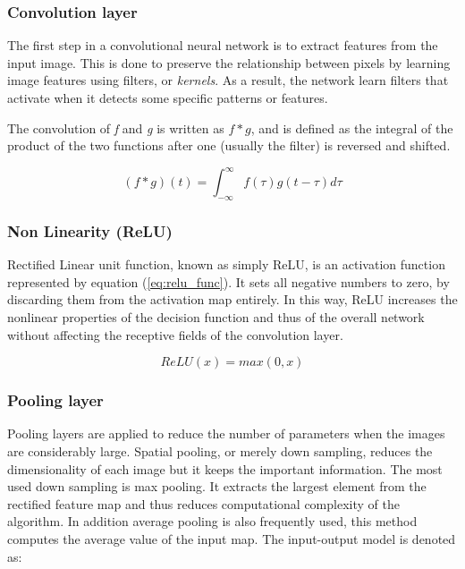 \documentclass[thesis.tex]{subfiles}
\begin{document}
\subsubsection{Convolution layer}
The first step in a convolutional neural network is to extract features from the input image. This is done to preserve the relationship between pixels by learning image features using filters, or \textit{kernels}. As a result, the network learn filters that activate when it detects some specific patterns or features.

The convolution of \textit{f} and \textit{g} is written as $f*g$, and is defined as the integral of the product of the two functions after one (usually the filter) is reversed and shifted.

\begin{equation} %
  (f*g)(t) = \int_{-\infty}^{\infty} f(\tau) g(t-\tau) d\tau
  \label{eq:convolution_func}
\end{equation}


\subsubsection{Non Linearity (ReLU)}
Rectified Linear unit function, known as simply ReLU, is an activation function represented by equation (\ref{eq:relu_func}). It sets all negative numbers to zero, by discarding them from the activation map entirely. In this way, ReLU increases the nonlinear properties of the decision function and thus of the overall network without affecting the receptive fields of the convolution layer.

\begin{equation} %
    ReLU(x) = max(0, x)
    \label{eq:relu_func}
\end{equation}


\subsubsection{Pooling layer}
Pooling layers are applied to reduce the number of parameters when the images are considerably large. Spatial pooling, or merely down sampling, reduces the dimensionality of each image but it keeps the important information. The most used down sampling is max pooling. It extracts the largest element from the rectified feature map and thus reduces computational complexity of the algorithm. In addition average pooling is also frequently used, this method computes the average value of the input map. The input-output model is denoted as:
\end{document}
